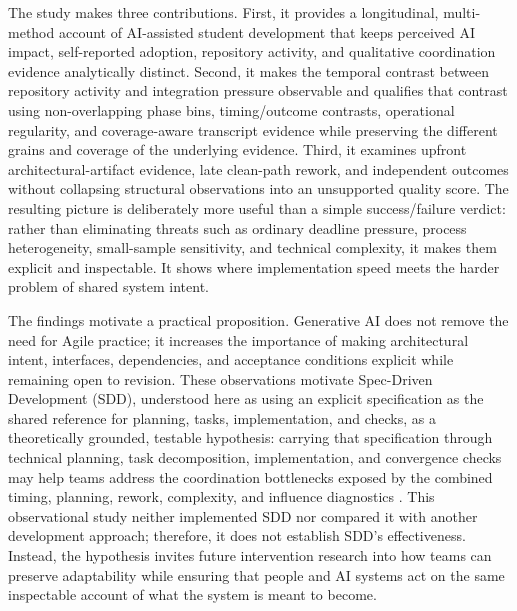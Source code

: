 The study makes three contributions. First, it provides a longitudinal,
multi-method account of AI-assisted student development that keeps perceived
AI impact, self-reported adoption, repository activity, and qualitative
coordination evidence analytically distinct. Second, it makes the temporal
contrast between repository activity and integration pressure observable and
qualifies that contrast using non-overlapping phase bins, timing/outcome
contrasts, operational regularity, and coverage-aware transcript evidence while
preserving the different grains and coverage of the underlying evidence.
Third, it examines upfront architectural-artifact evidence, late clean-path
rework, and independent outcomes without collapsing structural observations
into an unsupported quality score. The resulting picture is deliberately more
useful than a simple success/failure verdict: rather than eliminating threats
such as ordinary deadline pressure, process heterogeneity, small-sample
sensitivity, and technical complexity, it makes them explicit and inspectable.
It shows where implementation speed meets the harder problem of shared system
intent.

The findings motivate a practical proposition. Generative AI does not remove
the need for Agile practice; it increases the importance of making architectural
intent, interfaces, dependencies, and acceptance conditions explicit while
remaining open to revision. These observations motivate Spec-Driven
Development (SDD), understood here as using an explicit specification as the
shared reference for planning, tasks, implementation, and checks, as a
theoretically grounded, testable hypothesis: carrying that specification
through technical planning, task decomposition, implementation, and convergence
checks may help teams address the coordination bottlenecks exposed by the
combined timing, planning, rework, complexity, and influence diagnostics
\cite{github2025spec,thoughtworks202Xspec}. This observational study neither
implemented SDD nor compared it with another development approach; therefore,
it does not establish SDD's effectiveness. Instead, the hypothesis invites
future intervention research into how teams can preserve adaptability while
ensuring that people and AI systems act on the same inspectable account of what
the system is meant to become.
